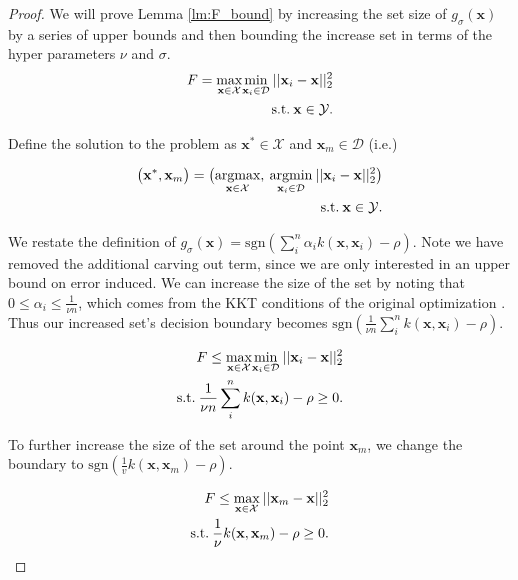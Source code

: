 \documentclass[10pt, conference]{ieeeconf}      %
\newcommand{\bx}{\mathbf{x}}
\begin{document}
\begin{proof}

We will   prove Lemma \ref{lm:F_bound} by increasing the set size of $g_{\sigma}(\bx)$ by a series of upper bounds and then bounding the increase set in terms of the hyper parameters $\nu$ and $\sigma$. \\

\begin{align}
   F = \underset{\bx \in \mathcal{X}}{\mbox{max}}\underset{\bx_i \in \mathcal{D} }{\mbox{min}}\: ||\bx_i-\bx||^2_2\\
\mbox{s.t.} \: \bx \in \mathcal{Y} \notag.
\end{align}

Define the solution to the problem  as $ \bx^* \in \mathcal{X}$ and $\bx_m \in \mathcal{D}$ (i.e.) 

\begin{align}
   \big(\bx^*,\bx_m \big)= \big(\underset{\bx \in \mathcal{X}}{\mbox{argmax}}, \: \underset{\bx_i \in \mathcal{D} }{\mbox{argmin}}\: ||\bx_i-\bx||^2_2\big)\\
\mbox{s.t.} \: \bx \in \mathcal{Y} \notag.
\end{align}

We restate the definition of $g_{\sigma}(\bx) = \mbox{sgn}(\sum_i^n \alpha_i k(\bx,\bx_i) - \rho)$. Note we have removed the additional carving out term, since we are only interested in an upper bound on error induced.  We can increase the size of the set by noting that $0 \leq \alpha_i \leq \frac{1}{\nu n}$, which comes from the KKT conditions of the original optimization \cite{scholkopf2001estimating}.  Thus our increased set's decision boundary becomes $\mbox{sgn}(\frac{1}{\nu n}\sum_i^n  k(\bx,\bx_i) - \rho)$. 

\begin{align*}
   F \leq \underset{\bx \in \mathcal{X}}{\mbox{max}}\underset{\bx_i \in \mathcal{D}}{\mbox{min}}\: ||\bx_i-\bx||^2_2\\
\mbox{s.t.} \: \frac{1}{\nu n}\sum_i^n  k(\bx,\bx_i) - \rho \geq 0 \notag.
\end{align*}

To further increase the size of the set around the point $\bx_m$, we change the boundary to  $\mbox{sgn}(\frac{1}{v}  k(\bx,\bx_m) - \rho)$. 

\begin{align*}
    F \leq \underset{\bx \in \mathcal{X}}{\mbox{max}}\: ||\bx_m-\bx||^2_2\\
\mbox{s.t.} \: \frac{1}{\nu }  k(\bx,\bx_m) - \rho \geq 0 \notag.
\end{align*}



\end{proof}
\end{document}
